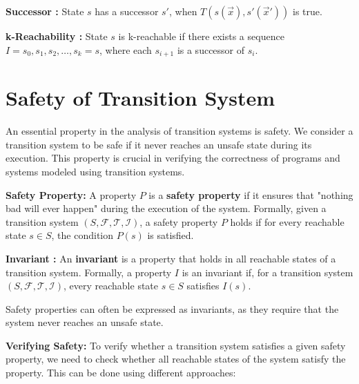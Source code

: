 \begin{definition}
    \textbf{Successor \cite{7886665}:}
    State $s$ has a successor $s'$, when $T(s(\vec{x}), s'(\vec{x}'))$ is true.
\end{definition}

\begin{definition}
    \textbf{k-Reachability \cite{7886665}:}
    State $s$ is k-reachable if there exists a sequence
    $I = s_0, s_1, s_2, \ldots, s_k = s$, where each $s_{i+1}$ is a successor of $s_i$.
\end{definition}

\section{Safety of Transition System}
\noindent An essential property in the analysis of transition systems is safety. We consider a transition system to be safe if it never reaches an unsafe state during its execution. This property is crucial in verifying the correctness of programs and systems modeled using transition systems.

\begin{definition}
    \textbf{Safety Property:}
    A property \( P \) is a \textbf{safety property} if it ensures that "nothing bad will ever happen" during the execution of the system. Formally, given a transition system \( (S, \mathcal{F}, \mathcal{T}, \mathcal{I}) \), a safety property \( P \) holds if for every reachable state \( s \in S \), the condition \( P(s) \) is satisfied.
\end{definition}

\begin{definition}
    \textbf{Invariant \cite{7886665}:}
    An \textbf{invariant} is a property that holds in all reachable states of a transition system. Formally, a property \( I \) is an invariant if, for a transition system \( (S, \mathcal{F}, \mathcal{T}, \mathcal{I}) \), every reachable state \( s \in S \) satisfies \( I(s) \).
\end{definition}

\noindent Safety properties can often be expressed as invariants, as they require that the system never reaches an unsafe state.

\vspace{\baselineskip}\noindent\textbf{Verifying Safety:} To verify whether a transition system satisfies a given safety property, we need to check whether all reachable states of the system satisfy the property. This can be done using different approaches:

